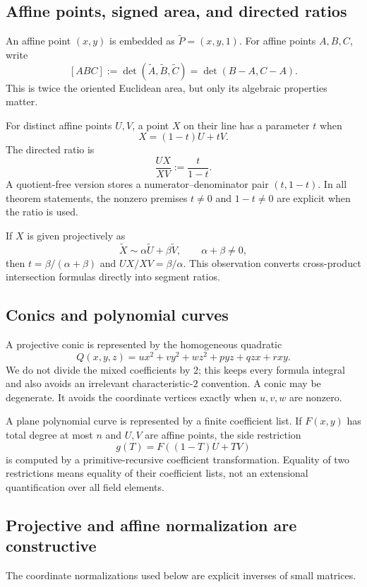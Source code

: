 \subsection{Affine points, signed area, and directed ratios}

An affine point $(x,y)$ is embedded as $\widetilde P=(x,y,1)$.  For affine points $A,B,C$, write
\[
[ABC]:=\det(\widetilde A,\widetilde B,\widetilde C)
       =\det(B-A,C-A).
\]
This is twice the oriented Euclidean area, but only its algebraic properties matter.

For distinct affine points $U,V$, a point $X$ on their line has a parameter $t$ when
\[
X=(1-t)U+tV.
\]
The directed ratio is
\[
\frac{UX}{XV}:=\frac{t}{1-t}.
\]
A quotient-free version stores a numerator--denominator pair $(t,1-t)$.  In all theorem statements, the nonzero premises $t\ne0$ and $1-t\ne0$ are explicit when the ratio is used.

If $X$ is given projectively as
\[
\widetilde X\sim \alpha\widetilde U+\beta\widetilde V,
\qquad \alpha+\beta\ne0,
\]
then $t=\beta/(\alpha+\beta)$ and $UX/XV=\beta/\alpha$.  This observation converts cross-product intersection formulas directly into segment ratios.

\subsection{Conics and polynomial curves}

A projective conic is represented by the homogeneous quadratic
\[
Q(x,y,z)=ux^2+vy^2+wz^2+p yz+q zx+r xy.
\]
We do not divide the mixed coefficients by $2$; this keeps every formula integral and also avoids an irrelevant characteristic-$2$ convention.  A conic may be degenerate.  It avoids the coordinate vertices exactly when $u,v,w$ are nonzero.

A plane polynomial curve is represented by a finite coefficient list.  If $F(x,y)$ has total degree at most $n$ and $U,V$ are affine points, the side restriction
\[
g(T)=F((1-T)U+TV)
\]
is computed by a primitive-recursive coefficient transformation.  Equality of two restrictions means equality of their coefficient lists, not an extensional quantification over all field elements.

\subsection{Projective and affine normalization are constructive}

The coordinate normalizations used below are explicit inverses of small matrices.

